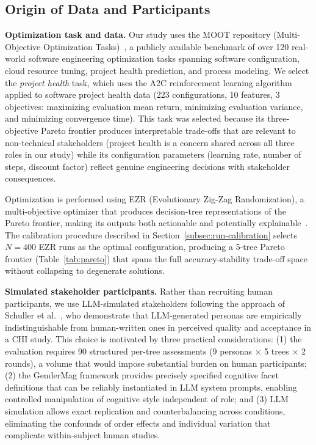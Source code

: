 \documentclass[sigconf,review]{acmart}
\begin{document}
\subsection{Origin of Data and Participants}
\label{subsec:data-origin}

\textbf{Optimization task and data.} Our study uses the MOOT repository
(Multi-Objective Optimization Tasks)~\cite{menzies2025moot}, a publicly
available benchmark of over 120 real-world software engineering optimization
tasks spanning software configuration, cloud resource tuning, project health
prediction, and process modeling. We select the \textit{project health} task,
which uses the A2C reinforcement learning algorithm applied to software project
health data (223 configurations, 10 features, 3 objectives: maximizing
evaluation mean return, minimizing evaluation variance, and minimizing
convergence time). This task was selected because its three-objective
Pareto frontier produces interpretable trade-offs that are relevant to
non-technical stakeholders (project health is a concern shared across
all three roles in our study) while its configuration parameters
(learning rate, number of steps, discount factor) reflect genuine
engineering decisions with stakeholder consequences.

Optimization is performed using EZR (Evolutionary Zig-Zag Randomization),
a multi-objective optimizer that produces decision-tree representations
of the Pareto frontier, making its outputs both actionable and
potentially explainable~\cite{menzies2025moot}. The calibration procedure
described in Section~\ref{subsec:run-calibration} selects $N=400$ EZR
runs as the optimal configuration, producing a 5-tree Pareto frontier
(Table~\ref{tab:pareto}) that spans the full accuracy-stability trade-off
space without collapsing to degenerate solutions.

\textbf{Simulated stakeholder participants.} Rather than recruiting
human participants, we use LLM-simulated stakeholders following the
approach of Schuller et al.~\cite{schuller2024generating}, who demonstrate
that LLM-generated personas are empirically indistinguishable from
human-written ones in perceived quality and acceptance in a CHI study.
This choice is motivated by three practical considerations: (1) the
evaluation requires 90 structured per-tree assessments (9 personas
$\times$ 5 trees $\times$ 2 rounds), a volume that would impose
substantial burden on human participants; (2) the GenderMag framework
provides precisely specified cognitive facet definitions that can be
reliably instantiated in LLM system prompts, enabling controlled
manipulation of cognitive style independent of role; and (3) LLM
simulation allows exact replication and counterbalancing across conditions,
eliminating the confounds of order effects and individual variation that
complicate within-subject human studies.
\end{document}
